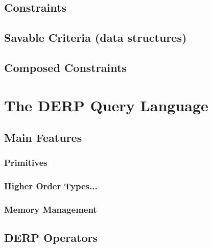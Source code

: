 \documentclass{article}
\begin{document}
\subsection{Constraints}
\subsection{Savable Criteria (data structures)}
\subsection{Composed Constraints}



\newpage
\section{\textbf{The DERP Query Language}}
\subsection{Main Features}
\subsubsection{Primitives}
\subsubsection{Higher Order Types...}
\subsubsection{Memory Management}
\subsection{DERP Operators}
\end{document}
